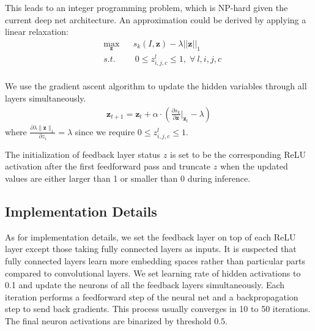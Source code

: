 This leads to an integer programming problem, which is NP-hard given the current deep net architecture. An approximation could be derived by applying a linear relaxation:
\begin{equation}
\begin{aligned}
& \max_\mathbf{z} & & s_k(I, \mathbf{z}) - \lambda ||\mathbf{z}||_1 \\
& s.t. & & \ 0 \leq z^l_{i,j,c} \leq 1, \; \forall\ l, i, j, c\\
\end{aligned}
\end{equation}

We use the gradient ascent algorithm to update the hidden variables through all layers simultaneously.
\begin{equation}
\begin{aligned}
\mathbf{z}_{t+1} = \mathbf{z}_t + \alpha \cdot (\frac{\partial s_k}{\partial \mathbf{z}} |_{\mathbf{z}_t} - \lambda)
\end{aligned}
\end{equation}
where $\frac{\partial \lambda \|\mathbf{z}\|_1}{\partial z_i} = \lambda$ since we require $0 \leq z^l_{i,j,c} \leq 1$.

The initialization of feedback layer status $z$ is set to be the corresponding ReLU activation after the first feedforward pass and truncate $z$ when the updated values are either larger than 1 or smaller than 0 during inference.

\subsection{Implementation Details}
As for implementation details, we set the feedback layer on top of each ReLU layer except those taking fully connected layers as inputs. It is suspected that fully connected layers learn more embedding spaces rather than particular parts compared to convolutional layers. We set learning rate of hidden activations to 0.1 and update the neurons of all the feedback layers simultaneously. Each iteration performs a feedforward step of the neural net and a backpropagation step to send back gradients. This process usually converges in 10 to 50 iterations. The final neuron activations are binarized by threshold $0.5$.
